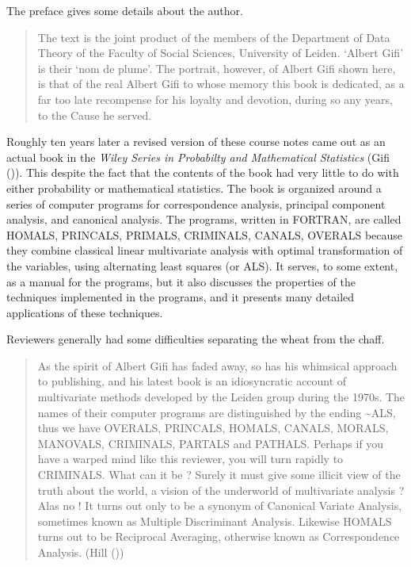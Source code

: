 \documentclass[
  12pt,
]{book}
\begin{document}
The preface gives some details about the author.

\begin{quote}
The text is the joint product of the members of the Department of Data Theory of the Faculty of Social Sciences, University of Leiden.
`Albert Gifi' is their `nom de plume'. The portrait, however, of Albert Gifi shown here, is that of the real Albert Gifi to whose
memory this book is dedicated, as a far too late recompense for his loyalty and devotion, during so any years, to the Cause he served.
\end{quote}

Roughly ten years later a revised version of these course notes came out as an actual book in the \emph{Wiley Series in Probabilty and Mathematical Statistics} (Gifi ()). This despite the fact that the contents of the book had very little to do with either probability or mathematical statistics. The book is organized around a series of computer programs for correspondence analysis, principal component analysis, and canonical analysis. The programs, written in FORTRAN, are called HOMALS, PRINCALS, PRIMALS, CRIMINALS, CANALS, OVERALS because they combine classical linear multivariate analysis with optimal transformation of the variables, using alternating least squares (or ALS). It serves, to some extent, as a manual for the programs, but it also discusses the properties of the techniques implemented in the programs, and it presents many detailed applications of these techniques.

Reviewers generally had some difficulties separating the wheat from the chaff.

\begin{quote}
As the spirit of Albert Gifi has faded away, so has his whimsical approach to
publishing, and his latest book is an idiosyncratic account of multivariate methods
developed by the Leiden group during the 1970s. The names of their computer programs
are distinguished by the ending \textasciitilde ALS, thus we have OVERALS, PRINCALS, HOMALS,
CANALS, MORALS, MANOVALS, CRIMINALS, PARTALS and PATHALS. Perhaps if you have a
warped mind like this reviewer, you will turn rapidly to CRIMINALS. What can it be ?
Surely it must give some illicit view of the truth about the world, a vision of the
underworld of multivariate analysis ? Alas no ! It turns out only to be a synonym of
Canonical Variate Analysis, sometimes known as Multiple Discriminant Analysis.
Likewise HOMALS turns out to be Reciprocal Averaging, otherwise known as
Correspondence Analysis. (Hill ())
\end{quote}
\end{document}
